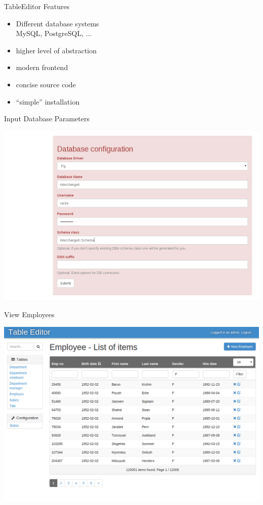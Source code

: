 \begin{frame}{TableEditor Features}
\begin{itemize}
\item Different database systems \\
      MySQL, PostgreSQL, ...
\item higher level of abstraction
\item modern frontend
\item concise source code
\item ``simple'' installation
\end{itemize}
\end{frame}

\begin{frame}[plain]{Input Database Parameters}
  \begin{center}
    \includegraphics[width=\textwidth,height=1\textheight,keepaspectratio]{images/input.png}
  \end{center}
\end{frame}

\begin{frame}[plain]{View Employees}
  \begin{center}
    \includegraphics[width=\textwidth,height=1\textheight,keepaspectratio]{images/list.png}
  \end{center}
\end{frame}

